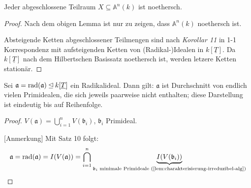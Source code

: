 \begin{prop}
  \label{prop:algebraische-mengen-noethersch}
  Jeder abgeschlossene Teilraum $X\subseteq\mathbb{A}^{n}(k)$ ist noethersch.
\end{prop}
\begin{proof}
  Nach dem obigen Lemma ist nur zu zeigen, dass $\mathbb{A}^{n}(k)$
  noethersch ist.

  Absteigende Ketten abgeschlossener Teilmengen sind nach \emph{Korollar
    11} in 1-1 Korrespondenz mit aufsteigenden Ketten von (Radikal-)Idealen
  in $k[\underline{T}]$. Da $k[\underline{T}]$ nach dem Hilbertschen
  Basissatz noethersch ist, werden letzere Ketten stationär.
\end{proof}
\begin{cor}[Primärzerlegung]
  \label{cor:primaerzerlegung}
  Sei $\mathfrak{a}=\operatorname{rad}(\mathfrak{a})\unlhd k[\underline{T}]$
  ein Radikalideal. Dann gilt: $\mathfrak{a}$ ist Durchschnitt von
  endlich vielen Primidealen, die sich jeweils paarweise nicht enthalten; diese
  Darstellung ist eindeutig bis auf Reihenfolge.
\end{cor}
\begin{proof}
  $V(\mathfrak{a})=\bigcup_{i=1}^{n}V(\mathfrak{b}_{i})$, $\mathfrak{b}_{i}$
  Primideal.%
  \begin{comment}
    Stationäre Kette folgt aus noethersch (Satz 21); mit Bemerkung 16
    bzw. Lemma 17 folgt, dass die $\mathfrak{b}_{i}$ Primideale sind.
  \end{comment}
  {} [Anmerkung] Mit Satz 10 folgt: %
  \[
    \mathfrak{a}=\operatorname{rad}(\mathfrak{a})=I(V(\mathfrak{a}))=\bigcap_{i=1}^{n}\underbrace{I(V(\mathfrak{b}_{i}))}_{\mathfrak{b}_{i}\text{ minimale Primideale (\ref{lem:charakterisierung-irreduzibel-alg})}}
  \]
\end{proof}

